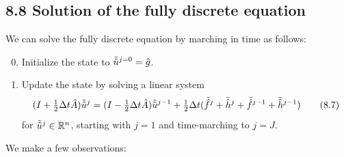 \subsection{8.8 Solution of the fully discrete equation}
We can solve the fully discrete equation by marching in time as follows:
\begin{enumerate}
    \setcounter{enumi}{-1}
    \item Initialize the state to $\tilde{\tilde{u}}^{j=0} = \hat{g}$.
    \item Update the state by solving a linear system
    \begin{equation*}
        (I + \tfrac{1}{2}\Delta t\hat{A})\tilde{\tilde{u}}^j = (I - \tfrac{1}{2}\Delta t\hat{A})\tilde{\tilde{u}}^{j-1} + \tfrac{1}{2}\Delta t(\tilde{\hat{f}}^j + \tilde{\hat{h}}^j + \tilde{\hat{f}}^{j-1} + \tilde{\hat{h}}^{j-1}) \tag{8.7}
    \end{equation*}
    for $\tilde{\tilde{u}}^j \in \mathbb{R}^n$, starting with $j = 1$ and time-marching to $j = J$.
\end{enumerate}
We make a few observations:
